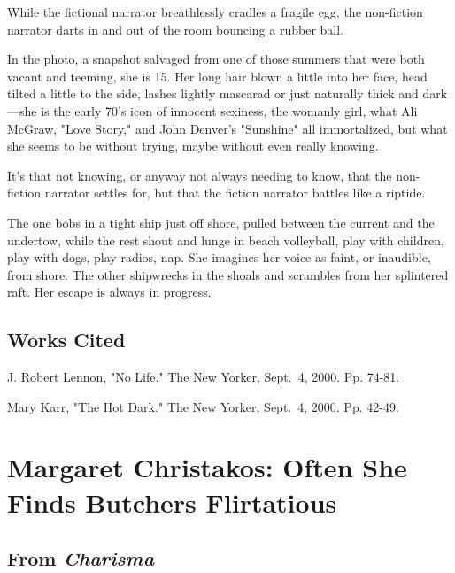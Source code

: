 \documentclass[
]{memoir}
\begin{document}
While the fictional narrator breathlessly cradles a fragile egg, the
non-fiction narrator darts in and out of the room bouncing a rubber
ball.

In the photo, a snapshot salvaged from one of those summers that were
both vacant and teeming, she is 15. Her long hair blown a little into
her face, head tilted a little to the side, lashes lightly mascarad or
just naturally thick and dark---she is the early 70's icon of innocent
sexiness, the womanly girl, what Ali McGraw, "Love Story," and John
Denver's "Sunshine" all immortalized, but what she seems to be without
trying, maybe without even really knowing.

It's that not knowing, or anyway not always needing to know, that the
non-fiction narrator settles for, but that the fiction narrator battles
like a riptide.

The one bobs in a tight ship just off shore, pulled between the current
and the undertow, while the rest shout and lunge in beach volleyball,
play with children, play with dogs, play radios, nap. She imagines her
voice as faint, or inaudible, from shore. The other shipwrecks in the
shoals and scrambles from her splintered raft. Her escape is always in
progress.

\hypertarget{works-cited-1}{%
\section*{Works Cited}\label{works-cited-1}}

J. Robert Lennon, "No Life." The New Yorker, Sept.~4, 2000. Pp. 74-81.

Mary Karr, "The Hot Dark." The New Yorker, Sept.~4, 2000. Pp. 42-49.

\hypertarget{margaret-christakos-often-she-finds-butchers-flirtatious}{%
\chapter{Margaret Christakos: Often She Finds Butchers
Flirtatious}\label{margaret-christakos-often-she-finds-butchers-flirtatious}}

\hypertarget{from-charisma}{%
\section*{\texorpdfstring{From
\emph{Charisma}}{From Charisma}}\label{from-charisma}}
\end{document}
